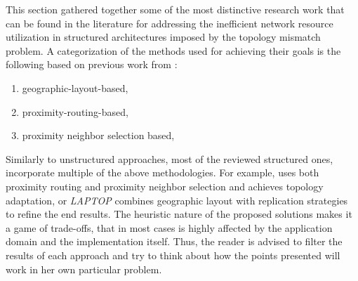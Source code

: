 
This section gathered together some of the most distinctive research work that
can be found in the literature for addressing the inefficient network resource
utilization in structured architectures imposed by the topology mismatch
problem. A categorization of the methods used for achieving their goals is the
following based on previous work from
\cite{CDHR2002,CDCR2002,RSS2002}:
\begin{enumerate}
  \item geographic-layout-based,
  \item proximity-routing-based,
  \item proximity neighbor selection based,
\end{enumerate}

Similarly to unstructured approaches, most of the reviewed structured ones,
incorporate multiple of the above methodologies. For example, \cite{KLKP2008}
uses both proximity routing and proximity neighbor selection and achieves
topology adaptation, or \emph{LAPTOP} combines geographic layout with
replication strategies to refine the end results. The heuristic nature
of the proposed solutions makes it a game of trade-offs, that in most cases
is highly affected by the application domain and the implementation itself.
Thus, the reader is advised to filter the results of each approach and try to
think about how the points presented will work in her own particular problem.

